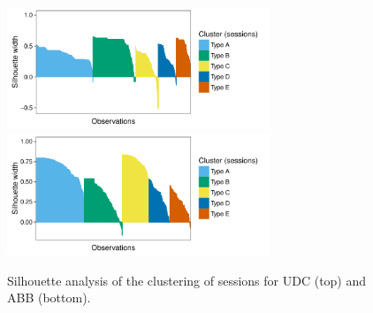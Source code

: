 \begin{figure}[!ht]
	\centering		
	\includegraphics[width=0.7\textwidth]{Figures/UDC_silhouette_sessions}
	\includegraphics[width=0.7\textwidth]{Figures/ABB_silhouette_sessions}	
	\caption{Silhouette analysis of the clustering of sessions for UDC (top) and ABB (bottom).}
	\label{silhouette_sessions}
\end{figure}

